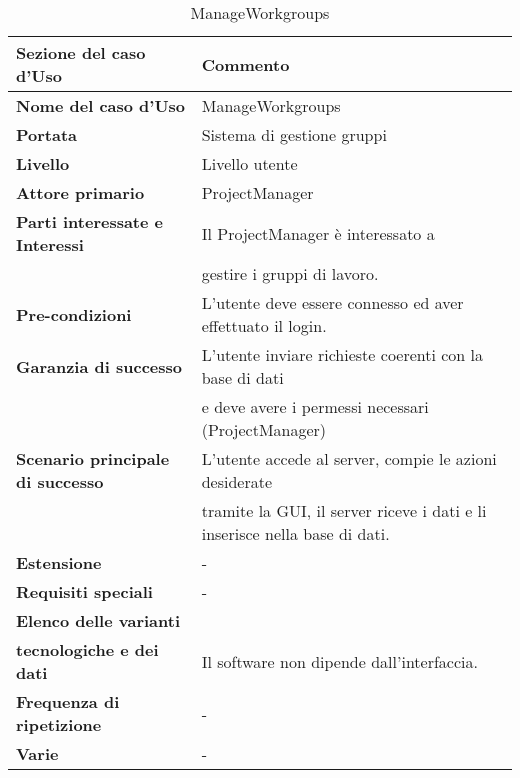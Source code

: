 \documentclass[12pt]{scrartcl}
\begin{document}
\begin{table}[h!]
  \caption{ManageWorkgroups}
  \label{tab:table7}
  \begin{tabular}{|l|l|}
    \toprule
    \textbf{Sezione del caso d'Uso} & \textbf{Commento}\\
    \midrule
    \textbf{Nome del caso d'Uso} & ManageWorkgroups\\
    \midrule
    \textbf{Portata} & Sistema di gestione gruppi\\
    \midrule
    \textbf{Livello} & Livello utente \\
    \midrule
    \textbf{Attore primario} & ProjectManager\\
    \midrule
    \textbf{Parti interessate e Interessi} & Il ProjectManager \`e interessato a 
    \\& gestire i gruppi di lavoro.\\
    \midrule
    \textbf{Pre-condizioni} & L'utente deve essere connesso ed aver effettuato il login.\\
    \midrule
    \textbf{Garanzia di successo} & L'utente inviare richieste coerenti con la base di dati 
    \\& e deve avere i permessi necessari (ProjectManager)\\
    \midrule
    \textbf{Scenario principale di successo} & L'utente accede al server, compie le azioni desiderate
    \\& tramite la GUI, il server riceve i dati e li inserisce nella base di dati.\\
    \midrule
    \textbf{Estensione} & - \\
    \midrule
    \textbf{Requisiti speciali} & -\\
    \midrule
    \textbf{Elenco delle varianti}\\ \textbf{tecnologiche e dei dati} & Il software non dipende dall'interfaccia. \\
    \midrule
    \textbf{Frequenza di ripetizione} & - \\
    \midrule
    \textbf{Varie} & - \\
    \bottomrule
  \end{tabular}
\end{table}
\end{document}

